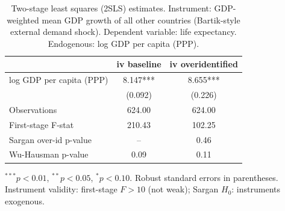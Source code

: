\begin{table}[htbp]
\centering
\caption{Two-stage least squares (2SLS) estimates. Instrument: GDP-weighted mean GDP growth of all other countries (Bartik-style external demand shock). Dependent variable: life expectancy. Endogenous: log GDP per capita (PPP).}
\label{tab:iv}
\begin{tabular}{lcc}
\toprule
 & iv
baseline & iv
overidentified \\
\midrule
log GDP per capita (PPP) & 8.147*** & 8.655*** \\
 & (0.092) & (0.226) \\
\midrule
Observations & 624.00 & 624.00 \\
First-stage F-stat & 210.43 & 102.25 \\
Sargan over-id p-value & -- & 0.46 \\
Wu-Hausman p-value & 0.09 & 0.11 \\
\bottomrule
\end{tabular}
\begin{tablenotes}\small\item $^{***}p<0.01$, $^{**}p<0.05$, $^{*}p<0.10$. Robust standard errors in parentheses. Instrument validity: first-stage $F > 10$ (not weak); Sargan $H_0$: instruments exogenous.\end{tablenotes}
\end{table}